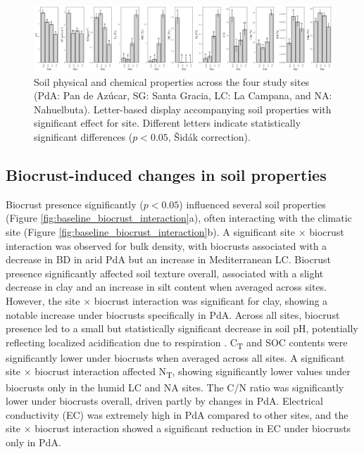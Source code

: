 \begin{figure}
    \centering
    \includegraphics[width=1\textwidth]{img/baseline_by_site.png}
    \caption{Soil physical and chemical properties across the four study sites (PdA: Pan de Azúcar, SG: Santa Gracia, LC: La Campana, and NA: Nahuelbuta). Letter-based display accompanying soil properties with significant effect for site. Different letters indicate statistically significant differences ($p < 0.05$, Šidák correction).}
    \label{fig:baseline_site}
\end{figure}

\FloatBarrier

\subsection{Biocrust-induced changes in soil properties}
\label{sec:BicorustInducedSoil}

Biocrust presence significantly ($p < 0.05$) influenced several soil properties (Figure \ref{fig:baseline_biocrust_interaction}a), often interacting with the climatic site (Figure \ref{fig:baseline_biocrust_interaction}b). A significant site $\times$ biocrust interaction was observed for bulk density, with biocrusts associated with a decrease in BD in arid PdA but an increase in Mediterranean LC. Biocrust presence significantly affected soil texture overall, associated with a slight decrease in clay and an increase in silt content when averaged across sites. However, the site $\times$ biocrust interaction was significant for clay, showing a notable increase under biocrusts specifically in PdA. Across all sites, biocrust presence led to a small but statistically significant decrease in soil pH, potentially reflecting localized acidification due to respiration \citep{Bachar2010}. C\textsubscript{T} and SOC contents were significantly lower under biocrusts when averaged across all sites. A significant site $\times$ biocrust interaction affected N\textsubscript{T}, showing significantly lower values under biocrusts only in the humid LC and NA sites. The C/N ratio was significantly lower under biocrusts overall, driven partly by changes in PdA. Electrical conductivity (EC) was extremely high in PdA compared to other sites, and the site $\times$ biocrust interaction showed a significant reduction in EC under biocrusts only in PdA.

